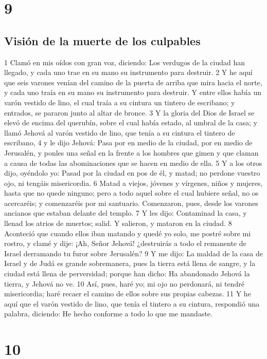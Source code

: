 \chapter{9}

\section*{Visión de la muerte de los culpables}

1 Clamó en mis oídos con gran voz, diciendo: Los verdugos de la ciudad han llegado, y cada uno trae en su mano su instrumento para destruir.
2 Y he aquí que seis varones venían del camino de la puerta de arriba que mira hacia el norte, y cada uno traía en su mano su instrumento para destruir. Y entre ellos había un varón vestido de lino, el cual traía a su cintura un tintero de escribano; y entrados, se pararon junto al altar de bronce.
3 Y la gloria del Dios de Israel se elevó de encima del querubín, sobre el cual había estado, al umbral de la casa; y llamó Jehová al varón vestido de lino, que tenía a su cintura el tintero de escribano,
4 y le dijo Jehová: Pasa por en medio de la ciudad, por en medio de Jerusalén, y ponles una señal en la frente a los hombres que gimen y que claman a causa de todas las abominaciones que se hacen en medio de ella.
5 Y a los otros dijo, oyéndolo yo: Pasad por la ciudad en pos de él, y matad; no perdone vuestro ojo, ni tengáis misericordia.
6 Matad a viejos, jóvenes y vírgenes, niños y mujeres, hasta que no quede ninguno; pero a todo aquel sobre el cual hubiere señal, no os acercaréis; y comenzaréis por mi santuario. Comenzaron, pues, desde los varones ancianos que estaban delante del templo.
7 Y les dijo: Contaminad la casa, y llenad los atrios de muertos; salid. Y salieron, y mataron en la ciudad.
8 Aconteció que cuando ellos iban matando y quedé yo solo, me postré sobre mi rostro, y clamé y dije: ¡Ah, Señor Jehová! ¿destruirás a todo el remanente de Israel derramando tu furor sobre Jerusalén?
9 Y me dijo: La maldad de la casa de Israel y de Judá es grande sobremanera, pues la tierra está llena de sangre, y la ciudad está llena de perversidad; porque han dicho: Ha abandonado Jehová la tierra, y Jehová no ve.
10 Así, pues, haré yo; mi ojo no perdonará, ni tendré misericordia; haré recaer el camino de ellos sobre sus propias cabezas.
11 Y he aquí que el varón vestido de lino, que tenía el tintero a su cintura, respondió una palabra, diciendo: He hecho conforme a todo lo que me mandaste.

\chapter{10}

